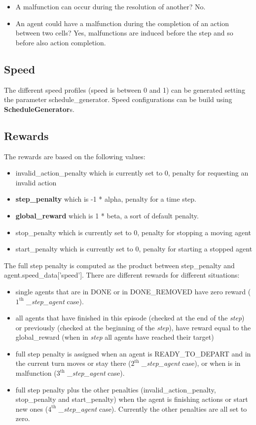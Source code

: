 \documentclass[11pt, a4paper, hidelinks]{report}
\begin{document}
\begin{itemize}
	\item A malfunction can occur during the resolution of another?
No.
	\item An agent could have a malfunction during the completion of an action between two cells?
Yes, malfunctions are induced before the step and so before also action completion.
\end{itemize}

\subsection{Speed}\label{subsec:speed}
The different speed profiles (speed is between 0 and 1) can be generated setting the parameter schedule\_generator.
Speed configurations can be build using \textbf{ScheduleGenerator}s.

\subsection{Rewards}\label{subsec:rewards}
The rewards are based on the following values:
\begin{itemize}
	\item invalid\_action\_penalty which is currently set to 0, penalty for requesting an invalid action
	\item \textbf{step\_penalty} which is -1 * alpha, penalty for a time step.
	\item \textbf{global\_reward} which is 1 * beta, a sort of default penalty.
	\item stop\_penalty which is currently set to 0, penalty for stopping a moving agent
	\item start\_penalty which is currently set to 0, penalty for starting a stopped agent
\end{itemize}

The full step penalty is computed as the product between step\_penalty and agent.speed\_data['speed'].
There are different rewards for different situations:

\begin{itemize}
	\item single agents that are in DONE or in DONE\_REMOVED have zero reward ($1^{\text{th}}$ \textit{\_step\_agent} case).
	\item all agents that have finished in this episode (checked at the end of the \textit{step}) or previously (checked at the beginning of the \textit{step}), have reward equal to the global\_reward (when in \textit{step} all agents have reached their target)
	\item full step penalty is assigned when an agent is READY\_TO\_DEPART and in the current turn moves or stay there ($2^{\text{th}}$ \textit{\_step\_agent} case), or when is in malfunction ($3^{\text{th}}$ \textit{\_step\_agent} case).
	\item full step penalty plus the other penalties (invalid\_action\_penalty, stop\_penalty and start\_penalty) when the agent is finishing actions or start new ones ($4^{\text{th}}$ \textit{\_step\_agent} case).
Currently the other penalties are all set to zero.
\end{itemize}
\end{document}
